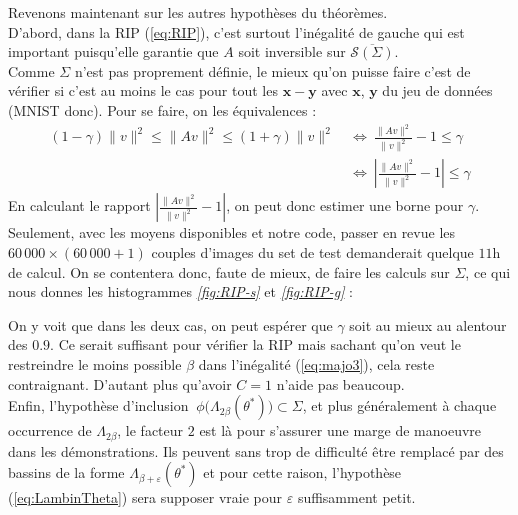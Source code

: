 \documentclass[hidelinks, french]{article} %
\newcommand{\Llr}{\Longleftrightarrow}
\renewcommand{\epsilon}{\varepsilon}
\renewcommand{\leq}{\leqslant}
\renewcommand{\bf}[1]{\boldsymbol{#1}}
\theoremstyle{enonce}
\theoremstyle{special}
\theoremstyle{rq}
\theoremstyle{exo}
\theoremstyle{demo}
\begin{document}
Revenons maintenant sur les autres hypothèses du théorèmes. 
\\
D'abord, dans la RIP (\ref{eq:RIP}), c'est surtout l'inégalité de gauche qui est important puisqu'elle garantie que $A$ soit inversible sur $\overline{\mathcal{S}(\Sigma)}$.
\\
Comme $\Sigma$ n'est pas proprement définie, le mieux qu'on puisse faire c'est de vérifier si c'est au moins le cas pour tout les $\bf{x}-\bf{y}$ avec $\bf{x}$, $\bf{y}$ du jeu de données (MNIST donc). Pour se faire, on les équivalences :
\begin{align*}(1-\gamma)\|v\|^2\leq \|Av\|^2\leq (1+\gamma)\|v\|^2\ &\Llr\ \frac{\|Av\|^2}{\|v\|^2}-1\leq \gamma\\
    &\Llr\ \left|\frac{\|Av\|^2}{\|v\|^2}-1\right|\leq \gamma\end{align*}
En calculant le rapport $\left|\frac{\|Av\|^2}{\|v\|^2}-1\right|$, on peut donc estimer une borne pour $\gamma$. Seulement, avec les moyens disponibles et notre code, passer en revue les $60\,000\times(60\,000+1)$ couples d'images du set de test demanderait quelque $11$h de calcul. On se contentera donc, faute de mieux, de faire les calculs sur $\Sigma$, ce qui nous donnes les histogrammes \textit{\ref{fig:RIP-s}} et \textit{\ref{fig:RIP-g}} :
\\

\begin{figure}[h]
\begin{floatrow}
{%
}

{%
}
\end{floatrow}\end{figure}

\noindent On y voit que dans les deux cas, on peut espérer que $\gamma$ soit au mieux au alentour des $0.9$. Ce serait suffisant pour vérifier la RIP mais sachant qu'on veut le restreindre le moins possible $\beta$ dans l'inégalité (\ref{eq:majo3}), cela reste contraignant. D'autant plus qu'avoir $C=1$ n'aide pas beaucoup.
\\

Enfin, l'hypothèse d'inclusion $\ \phi\big(\Lambda_{2\beta}(\theta^*)\big)\subset\Sigma$, et plus généralement à chaque occurrence de $\Lambda_{2\beta}$, le facteur $2$ est là pour s'assurer une marge de manoeuvre dans les démonstrations. Ils peuvent sans trop de difficulté être remplacé par des bassins de la forme $\Lambda_{\beta+\epsilon}(\theta^*)$ et pour cette raison, l’hypothèse (\ref{eq:LambinTheta}) sera supposer vraie pour $\epsilon$ suffisamment petit.
\\
\end{document}
